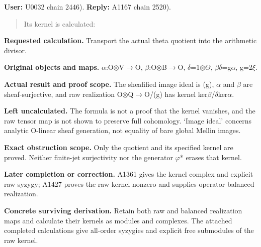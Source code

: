 \documentclass[10pt,a4paper,oneside]{report}
\begin{document}
\textbf{User:} U0032
\protect{} chain 2446).
\textbf{Reply:} A1167
\protect{} chain 2520).

\begin{quote}
Its kernel is calculated:
\end{quote}

\textbf{Requested calculation.} Transport the actual theta quotient into
the arithmetic divisor.

\textbf{Original objects and maps.}
\allowbreak{}\ensuremath{α}\allowbreak{}:O\allowbreak{}\ensuremath{⊗}\allowbreak{}V\allowbreak{}\ensuremath{→}\allowbreak{}O,
\allowbreak{}\ensuremath{β}\allowbreak{}:O\allowbreak{}\ensuremath{⊗}\allowbreak{}B\allowbreak{}\ensuremath{→}\allowbreak{}O,
\allowbreak{}\ensuremath{δ}\allowbreak{}=1\allowbreak{}\ensuremath{⊗}\allowbreak{}\allowbreak{}\ensuremath{Θ}\allowbreak{},
\allowbreak{}\ensuremath{β}\allowbreak{}\allowbreak{}\ensuremath{δ}\allowbreak{}=g\allowbreak{}\ensuremath{α}\allowbreak{},
g=2\allowbreak{}\ensuremath{ξ}\allowbreak{}.

\textbf{Actual result and proof scope.} The sheafified image ideal is
(g), \allowbreak{}\ensuremath{α}\allowbreak{} and
\allowbreak{}\ensuremath{β}\allowbreak{} are sheaf-surjective, and raw
realization
O\allowbreak{}\ensuremath{⊗}\allowbreak{}Q\allowbreak{}\ensuremath{→}\allowbreak{}O/(g)
has kernel
ker\allowbreak{}\ensuremath{β}\allowbreak{}/\allowbreak{}\ensuremath{δ}\allowbreak{}ker\allowbreak{}\ensuremath{α}\allowbreak{}.

\textbf{Left uncalculated.} The formula is not a proof that the kernel
vanishes, and the raw tensor map is not shown to preserve full
cohomology. `Image ideal' concerns analytic O-linear sheaf generation,
not equality of bare global Mellin images.

\textbf{Exact obstruction scope.} Only the quotient and its specified
kernel are proved. Neither finite-jet surjectivity nor the generator
\allowbreak{}\ensuremath{φ}\allowbreak{}* erases that kernel.

\textbf{Later completion or correction.} A1361 gives the kernel complex
and explicit raw syzygy; A1427 proves the raw kernel nonzero and
supplies operator-balanced realization.

\textbf{Concrete surviving derivation.} Retain both raw and balanced
realization maps and calculate their kernels as modules and complexes.
The attached completed calculations give all-order syzygies and explicit
free submodules of the raw kernel.
\end{document}
